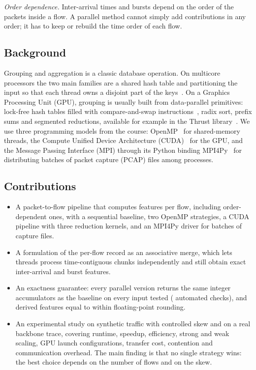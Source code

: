\emph{Order dependence.} Inter-arrival times and bursts depend on the order of
the packets inside a flow. A parallel method cannot simply add contributions
in any order; it has to keep or rebuild the time order of each flow.

\subsection{Background}
Grouping and aggregation is a classic database operation. On multicore
processors the two main families are a shared hash table and partitioning the
input so that each thread owns a disjoint part of the
keys~\cite{cieslewicz,balkesen}. On a Graphics Processing Unit (GPU), grouping
is usually built from data-parallel primitives: lock-free hash tables filled
with compare-and-swap instructions~\cite{alcantara}, radix sort, prefix sums
and segmented reductions, available for example in the Thrust
library~\cite{thrust}. We use three programming models from the course:
OpenMP~\cite{openmp} for shared-memory threads, the Compute Unified Device
Architecture (CUDA)~\cite{cuda} for the GPU, and the Message Passing Interface
(MPI) through its Python binding MPI4Py~\cite{mpi4py} for distributing batches
of packet capture (PCAP) files among processes.

\subsection{Contributions}
\begin{itemize}
\item A packet-to-flow pipeline that computes \nfeat{} features per flow,
including order-dependent ones, with a sequential baseline, two OpenMP
strategies, a CUDA pipeline with three reduction kernels, and an MPI4Py
driver for batches of capture files.
\item A formulation of the per-flow record as an associative merge, which lets
threads process time-contiguous chunks independently and still obtain exact
inter-arrival and burst features.
\item An exactness guarantee: every parallel version returns the same integer
accumulators as the baseline on every input tested (\nchecks{} automated
checks), and derived features equal to within floating-point rounding.
\item An experimental study on synthetic traffic with controlled skew and on a
real backbone trace, covering runtime, speedup, efficiency, strong and weak
scaling, GPU launch configurations, transfer cost, contention and
communication overhead. The main finding is that no single strategy wins:
the best choice depends on the number of flows and on the skew.
\end{itemize}
